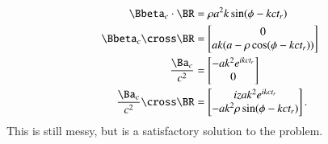 {\begin{equation}
\begin{aligned}
\Bbeta_c \cdot \BR &= \rho a^2 k \sin(\phi -  k c t_r) \\
\Bbeta_c \cross \BR
&=
\begin{bmatrix}
0 \\
a k ( a - \rho \cos(\phi -  k c t_r) )
\end{bmatrix} \\
\frac{\Ba_c}{c^2} &=
\begin{bmatrix}
- a k^2 e^{i k c t_r} \\
0
\end{bmatrix} \\
\frac{\Ba_c}{c^2} \cross \BR
&=
\begin{bmatrix}
i z a k^2 e^{i k c t_r} \\
- a k^2 \rho \sin(\phi -  k c t_r)
\end{bmatrix}.
\end{aligned}
\end{equation}
%
This is still messy, but is a satisfactory solution to the problem.

}

